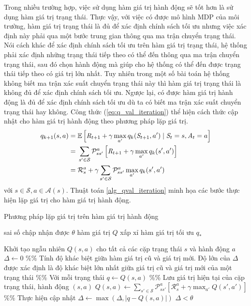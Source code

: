 Trong nhiều trường hợp, việc sử dụng hàm giá trị hành động sẽ tốt hơn là sử dụng hàm giá trị trạng thái. 
Thực vậy, với việc có được mô hình MDP của môi trường, hàm giá trị trạng thái là đủ để xác định chính sách tối ưu nhưng việc xác định này phải qua một bước trung gian thông qua ma trận chuyển trạng thái. 
Nói cách khác để xác định chính sách tối ưu trên hàm giá trị trạng thái, hệ thống phải xác định những trạng thái tiếp theo có thể đến thông qua ma trận chuyển trạng thái, sau đó chọn hành động mà giúp cho hệ thống có thể đến được trạng thái tiếp theo có giá trị lớn nhất. 
Tuy nhiên trong một số bài toán hệ thống không biết ma trận xác suất chuyển trạng thái này thì hàm giá trị trạng thái là không đủ để xác định chính sách tối ưu. 
Ngược lại, có được hàm giá trị hành động là đủ để xác định chính sách tối ưu dù ta có biết ma trận xác suất chuyển trạng thái hay không.
Công thức (\ref{eq:q_val_iteration}) thể hiện cách thức cập nhật cho hàm giá trị hành động theo phương pháp lặp giá trị.
\begin{align}
q_{k+1}(s,a) = {} & \mathbb{E}\left[\mathit{R}_{t+1} + \gamma \max_{a'}q_{k}(\mathit{S}_{t+1},a') \mid \mathit{S}_{t} = s, \mathit{A}_t = a\right] \notag \\
= {} & \sum_{s' \in \mathcal{S}}\mathcal{P}_{ss'}^{a}\left[\mathit{R}_{t+1} + \gamma \max_{a'}q_{k}(s',a')\right] \notag \\
= {} & \mathcal{R}_{s}^{a} + \gamma \sum_{s' \in \mathcal{S}}\mathcal{P}_{ss'}^{a} \max_{a'}q_{k}(s',a') 
\label{eq:q_val_iteration}
\end{align}
với $s \in \mathcal{S}, a \in \mathcal{A}(s)$. 
Thuật toán \ref{alg_qval_iteration} minh họa các bước thực hiện lặp giá trị cho hàm giá trị hành động.

\begin{algorithm}
	\caption{Phương pháp lặp giá trị trên hàm giá trị hành động}
	\label{alg_qval_iteration}
	\begin{algorithmic}[1]
		\renewcommand{\algorithmicrequire}{\textbf{Đầu vào:}}
		\renewcommand{\algorithmicensure}{\textbf{Đầu ra:}}
		\algnewcommand{}
		\algnewcommand\Operation{\item[\algorithmicoperation]}
		
		\Require sai số chập nhận được $\theta$
		\Ensure hàm giá trị $Q$ xấp xỉ hàm giá trị tối ưu $q_{*}$
		
		\Operation
		\State Khởi tạo ngẫu nhiên $Q(s,a)$ cho tất cả các cặp trạng thái $s$ và hành động $a$
		\Repeat
		\State $\Delta \leftarrow 0$ \%\% Tính độ khác biệt giữa hàm giá trị cũ và giá trị mới. Độ lớn của $\Delta$ được xác định là độ khác biệt lớn nhất giữa giá trị cũ và giá trị mới của một trạng thái
		 \%\% Với mỗi trạng thái
		\State $q \leftarrow Q(s,a)$ \%\% Lưu giá trị hiện tại của cặp trạng thái, hành động $(s,a)$
		\State $Q(s,a) \leftarrow \sum_{s' \in \mathcal{S}}\mathcal{P}_{ss'}^{a}\left[\mathcal{R}_{s}^{a} + \gamma \max_{a'}Q(s',a')\right]$ \%\% Thực hiện cập nhật
		\State $\Delta \leftarrow \max(\Delta,|q - Q(s,a)|)$
		\EndFor
		\Until $\Delta < \theta$
	\end{algorithmic}
\end{algorithm}


